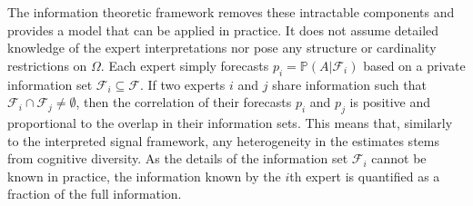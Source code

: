 \documentclass[11pt,twoside]{article}
\renewcommand{\P}{\mathbb{P}}
\begin{document}
The information theoretic framework removes these intractable components and provides a model that can be applied in practice. It does not assume detailed knowledge of the expert interpretations nor pose any structure or cardinality restrictions on $\Omega$.  Each expert simply forecasts $p_i = \P\left(A | \mathcal{F}_i\right)$ based on a private information set $\mathcal{F}_i \subseteq \mathcal{F}$. 
If two experts $i$ and $j$ share information such that $\mathcal{F}_i \cap \mathcal{F}_j \neq \emptyset$, then the correlation of their forecasts $p_i$ and $p_j$ is positive and proportional to the overlap in their information sets. This means that, similarly to the interpreted signal framework, any heterogeneity in the estimates stems from cognitive diversity. As the details of the information set $\mathcal{F}_i$ cannot be known in practice, the information known by the $i$th expert is quantified as a fraction of the full information. 


\end{document}
